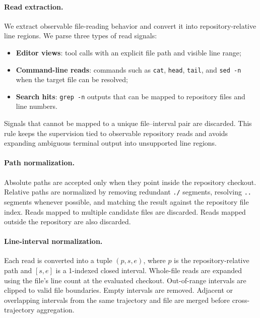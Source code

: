 \documentclass{llmxive}
\begin{document}
\paragraph{Read extraction.}
We extract observable file-reading behavior and convert it into
repository-relative line regions. We parse three types of read signals:
\begin{itemize}
    \item \textbf{Editor views}: tool calls with an explicit file path and visible line range;
    \item \textbf{Command-line reads}: commands such as \texttt{cat}, \texttt{head}, \texttt{tail}, and \texttt{sed -n} when the target file can be resolved;
    \item \textbf{Search hits}: \texttt{grep -n} outputs that can be mapped to repository files and line numbers.
\end{itemize}
Signals that cannot be mapped to a unique file--interval pair are discarded.
This rule keeps the supervision tied to observable repository reads and avoids
expanding ambiguous terminal output into unsupported line regions.

\paragraph{Path normalization.}
Absolute paths are accepted only when they point inside the repository checkout.
Relative paths are normalized by removing redundant \texttt{./} segments,
resolving \texttt{..} segments whenever possible, and matching the result
against the repository file index. Reads mapped to multiple candidate files are
discarded. Reads mapped outside the repository are also discarded.

\paragraph{Line-interval normalization.}
Each read is converted into a tuple $(p,s,e)$, where $p$ is the
repository-relative path and $[s,e]$ is a 1-indexed closed interval. Whole-file
reads are expanded using the file's line count at the evaluated checkout.
Out-of-range intervals are clipped to valid file boundaries. Empty intervals are
removed. Adjacent or overlapping intervals from the same trajectory and file are
merged before cross-trajectory aggregation.
\end{document}

